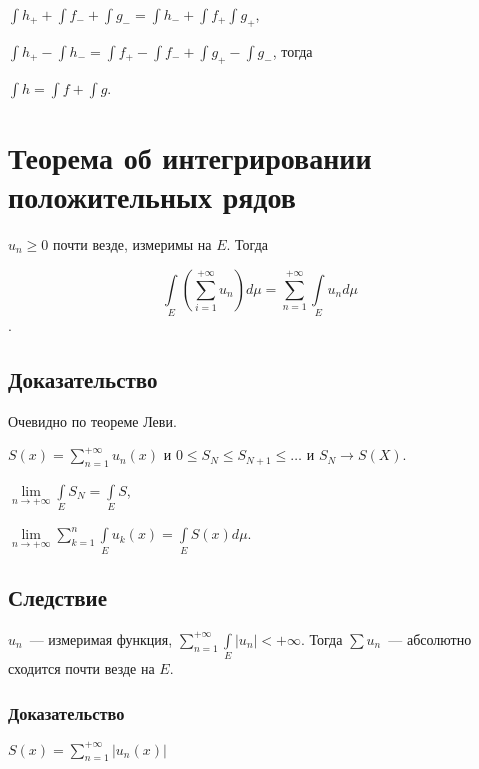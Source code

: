 \documentclass{article}
\begin{document}
                $\int h_+ + \int f_- + \int g_- = \int h_- + \int f_+ \int g_+$,
                
                $\int h_+ - \int h_- = \int f_+ - \int f_- + \int g_+ - \int g_-$, тогда
                
                $\int h = \int f + \int g$.
    
    \newpage
        
    \section{Теорема об интегрировании положительных рядов}
    
        $u_n \geqslant 0$ почти везде, измеримы на $E$. Тогда
        
        $$\int\limits_{E} \left( \sum\limits^{+\infty}_{i = 1} u_n \right) d \mu = \sum\limits^{+\infty}_{n = 1} \int\limits_{E} u_n d \mu$$.
        
        \subsection{Доказательство}
        
            Очевидно по теореме Леви.
            
            $S(x) = \sum\limits^{+\infty}_{n = 1} u_n(x)$ и $0 \leqslant S_N \leqslant S_{N + 1} \leqslant \ldots$ и $S_N \rightarrow S(X)$.
            
            $\lim\limits_{n \rightarrow +\infty} \int\limits_{E} S_N = \int\limits_{E} S$,
            
            $\lim\limits_{n \rightarrow +\infty} \sum\limits^n_{k = 1} \int\limits_{E} u_k(x) = \int\limits_{E} S(x) d \mu$.
            
        \subsection{Следствие}
        
            $u_n$~--- измеримая функция, $\sum\limits^{+\infty}_{n = 1} \int\limits_{E} | u_n | < +\infty$. Тогда $\sum u_n$~--- абсолютно сходится почти везде на $E$.
            
            \subsubsection{Доказательство}
            
                $S(x) = \sum\limits^{+\infty}_{n = 1} | u_n(x) |$
                
\end{document}
